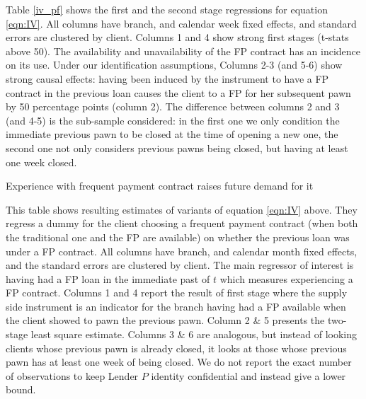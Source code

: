 Table \ref{iv_pf} shows the first and the second stage regressions for equation \ref{eqn:IV}. All columns have branch, and calendar week fixed effects, and standard errors are clustered by client. Columns 1 and 4 show strong first stages (t-stats above 50). The availability and unavailability of the FP contract has an incidence on its use. Under our identification assumptions, Columns 2-3 (and 5-6) show strong causal effects: having  been induced by the instrument to have a FP contract in the previous loan causes the client to a FP for her subsequent pawn by 50 percentage points (column 2). The difference between columns 2 and 3 (and 4-5) is the sub-sample considered: in the first one we only condition the immediate previous pawn to be closed at the time of opening a new one, the second one not only considers previous pawns being closed, but having at least one week closed.


\begin{table}[H]
\caption{Experience with frequent payment contract raises future demand for it}
\label{iv_pf}
\begin{center}
\footnotesize{}
\end{center}
 \scriptsize
This table shows resulting estimates of variants of equation  \ref{eqn:IV} above. They regress a dummy for the client choosing a frequent payment contract (when both the traditional one and the FP are available) on whether the previous loan was under a FP contract. All columns have branch, and calendar month fixed effects, and the standard errors are clustered by client. The main regressor of interest is having had a FP loan in the immediate past of $t$ which measures experiencing a FP contract. Columns 1 and 4 report the result of first stage where the supply side instrument is an indicator for the branch having had a FP available when the client showed to pawn the previous pawn. Column 2 \& 5 presents the two-stage least square estimate. Columns 3 \& 6 are analogous, but instead of looking clients whose previous pawn is already closed, it looks at those whose previous pawn has at least one week of being closed. We do not report the exact number of observations to keep Lender $P$ identity confidential and instead give a lower bound. 
\end{table}






